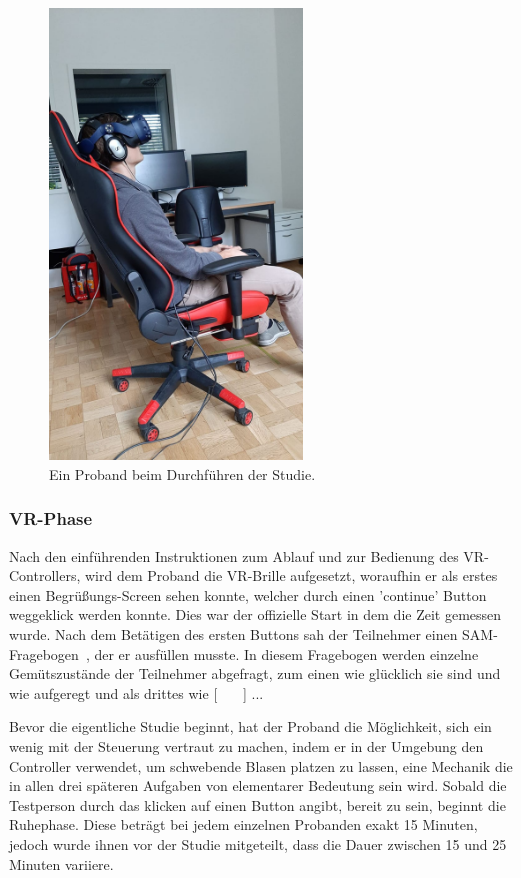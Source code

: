 \begin{figure}[H]
	\centering
	\includegraphics[width=0.6\textwidth]{./images/studie_awf.jpeg}
	\caption{Ein Proband beim Durchführen der Studie.}
	\label{fig:study_setup}
\end{figure}


\subsubsection{VR-Phase}
Nach den einführenden Instruktionen zum Ablauf und zur Bedienung des VR-Controllers, wird dem Proband die VR-Brille aufgesetzt, woraufhin er als erstes einen Begrüßungs-Screen sehen konnte, welcher durch einen 'continue' Button weggeklick werden konnte. 
Dies war der offizielle Start in dem die Zeit gemessen wurde. 
Nach dem Betätigen des ersten Buttons sah der Teilnehmer einen SAM-Fragebogen~\cite{bradley1994measuring}, der er ausfüllen musste. 
In diesem Fragebogen werden einzelne Gemütszustände der Teilnehmer abgefragt, zum einen wie glücklich sie sind und wie aufgeregt und als drittes wie [ \ \ \ ] ... 

Bevor die eigentliche Studie beginnt, hat der Proband die Möglichkeit, sich ein wenig mit der Steuerung vertraut zu machen, indem er in der Umgebung den Controller verwendet, um schwebende Blasen platzen zu lassen, eine Mechanik die in allen drei späteren Aufgaben von elementarer Bedeutung sein wird. Sobald die Testperson durch das klicken auf einen Button angibt, bereit zu sein, beginnt die Ruhephase. Diese beträgt bei jedem einzelnen Probanden exakt 15 Minuten, jedoch wurde ihnen vor der Studie mitgeteilt, dass die Dauer zwischen 15 und 25 Minuten variiere.

